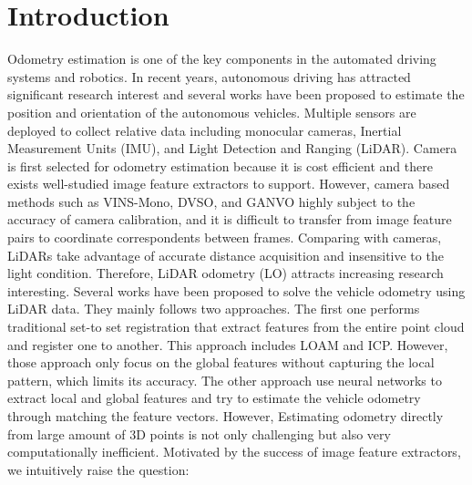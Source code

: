 \documentclass[sigconf]{acmart}
\begin{document}


\maketitle

\section{Introduction}

Odometry estimation is one of the key components in the automated driving systems and robotics. In recent years, autonomous driving has attracted significant research interest and several works have been proposed to estimate the position and orientation of the autonomous vehicles. Multiple sensors are deployed to collect relative data including monocular cameras, Inertial Measurement Units (IMU), and Light Detection and Ranging (LiDAR). Camera is first selected for odometry estimation because it is cost efficient and there exists well-studied image feature extractors to support. However, camera based methods such as VINS-Mono\cite{VINS-Mono}, DVSO\cite{DVSO}, and GANVO\cite{GANVO} highly subject to the accuracy of camera calibration, and it is difficult to transfer from image feature pairs to coordinate correspondents between frames. Comparing with cameras, LiDARs take advantage of accurate distance acquisition and insensitive to the light condition. Therefore, LiDAR odometry (LO) attracts increasing research interesting. Several works have been proposed to solve the vehicle odometry using LiDAR data. They mainly follows two approaches. The first one performs traditional set-to set registration that extract features from the entire point cloud and register one to another. This approach includes LOAM\cite{LOAM} and ICP\cite{ICP_l}\cite{GICP}\cite{ICP_p2plane}. However, those approach only focus on the global features without capturing the local pattern, which limits its accuracy. The other approach use neural networks to extract local and global features and try to estimate the vehicle odometry through matching the feature vectors. However, Estimating odometry directly from large amount of 3D points is not only challenging but also very computationally inefficient. Motivated by the success of image feature extractors, we intuitively raise the question: 
\end{document}
